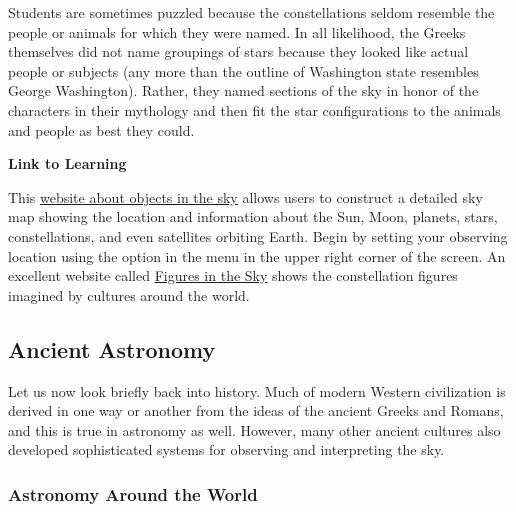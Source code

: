 \documentclass[main.tex]{subfiles}
\begin{document}
\vspace{1em}

Students are sometimes puzzled because the constellations seldom resemble the people or animals for which they were named. In all likelihood, the Greeks themselves did not name groupings of stars because they looked like actual people or subjects (any more than the outline of Washington state resembles George Washington). Rather, they named sections of the sky in honor of the characters in their mythology and then fit the star configurations to the animals and people as best they could.

\begin{mdframed}[backgroundcolor=black!10]
    \textbf{Link to Learning}
    
    \vspace{1ex}

    This \href{https://openstax.org/l/30heavensabove}{website about objects in the sky} allows users to construct a detailed sky map showing the location and information about the Sun, Moon, planets, stars, constellations, and even satellites orbiting Earth. Begin by setting your observing location using the option in the menu in the upper right corner of the screen. An excellent website called \href{https://openstax.org/l/30constel}{Figures in the Sky} shows the constellation figures imagined by cultures around the world.
\end{mdframed}

\subsection{Ancient Astronomy}

Let us now look briefly back into history. Much of modern Western civilization is derived in one way or another from the ideas of the ancient Greeks and Romans, and this is true in astronomy as well. However, many other ancient cultures also developed sophisticated systems for observing and interpreting the sky.

\subsubsection*{Astronomy Around the World}
\end{document}
